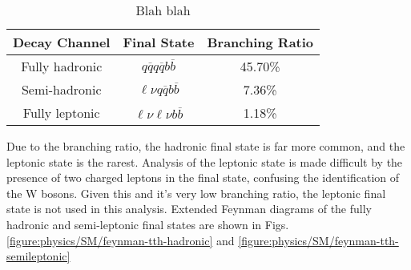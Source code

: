 \begin{table}[h]
\centering
	\begin{tabular}{ c c c }
	\hline \hline
	Decay Channel & Final State & Branching Ratio \\ \hline \hline
	Fully hadronic & $q\overline{q}q\overline{q}b\overline{b}$ & 45.70\% \\ \hline
	Semi-hadronic &  $\ell \nu q\overline{q}b\overline{b}$ & 7.36\% \\ \hline
	Fully leptonic & $\ell \nu \ell \nu b\overline{b}$ & 1.18\% \\ \hline 
	\end{tabular}
	\caption{Blah blah}
	\label{table:physics/final-states}
\end{table}

Due to the branching ratio, the hadronic final state is far more common, and the leptonic state is the rarest. Analysis of the leptonic state is made difficult by the presence of two charged leptons in the final state, confusing the identification of the W bosons. Given this and it's very low branching ratio, the leptonic final state is not used in this analysis. Extended Feynman diagrams of the fully hadronic and semi-leptonic final states are shown in Figs. \ref{figure:physics/SM/feynman-tth-hadronic} and \ref{figure:physics/SM/feynman-tth-semileptonic}

